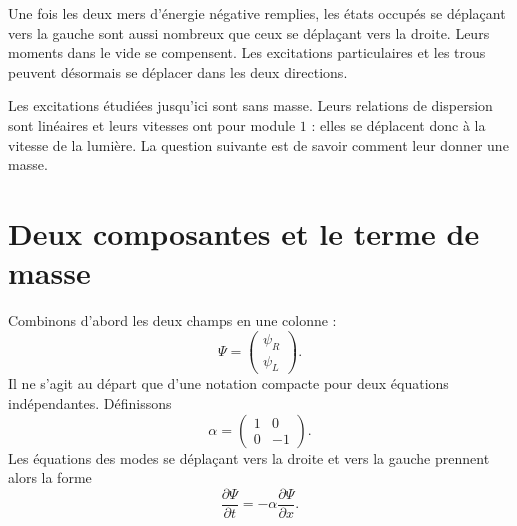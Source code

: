 Une fois les deux mers d’énergie négative remplies, les états occupés se déplaçant vers la gauche sont aussi nombreux que ceux se déplaçant vers la droite. Leurs moments dans le vide se compensent. Les excitations particulaires et les trous peuvent désormais se déplacer dans les deux directions.

\begin{classroomqa}
\end{classroomqa}

Les excitations étudiées jusqu’ici sont sans masse. Leurs relations de dispersion sont linéaires et leurs vitesses ont pour module \(1\) : elles se déplacent donc à la vitesse de la lumière. La question suivante est de savoir comment leur donner une masse.

\section{Deux composantes et le terme de masse}

Combinons d’abord les deux champs en une colonne :
\begin{equation}
\Psi=
\begin{pmatrix}
\psi_R\\
\psi_L
\end{pmatrix}.
\end{equation}
Il ne s’agit au départ que d’une notation compacte pour deux équations indépendantes. Définissons
\begin{equation}
\alpha=
\begin{pmatrix}
1&0\\
0&-1
\end{pmatrix}.
\end{equation}
Les équations des modes se déplaçant vers la droite et vers la gauche prennent alors la forme
\begin{equation}
\frac{\partial\Psi}{\partial t}
=
-\alpha\frac{\partial\Psi}{\partial x}.
\end{equation}

